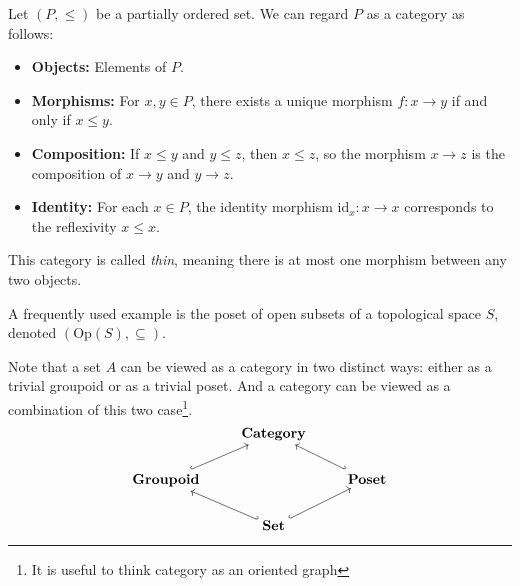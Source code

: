 \begin{example}[Poset]
Let $(P, \leq)$ be a partially ordered set. We can regard $P$ as a category as follows:
\begin{itemize}
    \item \textbf{Objects:} Elements of $P$.
    \item \textbf{Morphisms:} For $x, y \in P$, there exists a unique morphism $f: x \to y$ if and only if $x \leq y$.
    \item \textbf{Composition:} If $x \leq y$ and $y \leq z$, then $x \leq z$, so the morphism $x \to z$ is the composition of $x \to y$ and $y \to z$.
    \item \textbf{Identity:} For each $x \in P$, the identity morphism $\mathrm{id}_x: x \to x$ corresponds to the reflexivity $x \leq x$.
\end{itemize}

This category is called \emph{thin}, meaning there is at most one morphism between any two objects.

A frequently used example is the poset of open subsets of a topological space $S$, denoted $(\mathrm{Op}(S), \subseteq)$.
\end{example}

Note that a set $A$ can be viewed as a category in two distinct ways: either as a trivial groupoid or as a trivial poset. And a category can be viewed as a combination of this two case\footnote{It is useful to think category as an oriented graph}.
\[\begin{tikzcd}[ampersand replacement=\&,cramped]
\& \textbf{Category} \\
	\textbf{Groupoid} \&\& \textbf{Poset} \\
	\& \textbf{Set}
	\arrow[hook, from=2-1, to=1-2]
	\arrow[hook', from=2-3, to=1-2]
	\arrow[hook', from=3-2, to=2-1]
	\arrow[hook, from=3-2, to=2-3]
\end{tikzcd}\]

